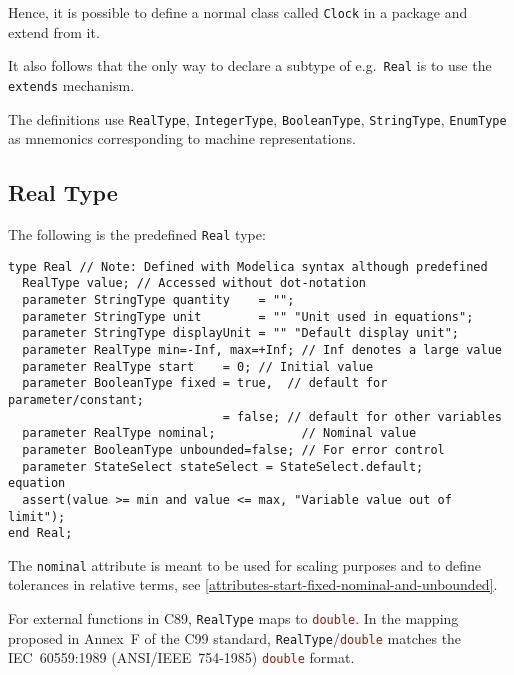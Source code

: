 \begin{nonnormative}
Hence, it is possible to define a normal class called \lstinline!Clock! in a package and extend from it.
\end{nonnormative}

\begin{nonnormative}
It also follows that the only way to declare a subtype of e.g.\ \lstinline!Real! is to use the \lstinline!extends! mechanism.
\end{nonnormative}

The definitions use \lstinline!RealType!, \lstinline!IntegerType!, \lstinline!BooleanType!, \lstinline!StringType!, \lstinline!EnumType!
as mnemonics corresponding to machine representations.

\subsection{Real Type}\label{real-type}

The following is the predefined \lstinline!Real! type:
\begin{lstlisting}[language=modelica]
type Real // Note: Defined with Modelica syntax although predefined
  RealType value; // Accessed without dot-notation
  parameter StringType quantity    = "";
  parameter StringType unit        = "" "Unit used in equations";
  parameter StringType displayUnit = "" "Default display unit";
  parameter RealType min=-Inf, max=+Inf; // Inf denotes a large value
  parameter RealType start    = 0; // Initial value
  parameter BooleanType fixed = true,  // default for parameter/constant;
                              = false; // default for other variables
  parameter RealType nominal;            // Nominal value
  parameter BooleanType unbounded=false; // For error control
  parameter StateSelect stateSelect = StateSelect.default;
equation
  assert(value >= min and value <= max, "Variable value out of limit");
end Real;
\end{lstlisting}

The \lstinline!nominal! attribute is meant to be used for scaling purposes and to
define tolerances in relative terms, see \cref{attributes-start-fixed-nominal-and-unbounded}.

\begin{nonnormative}
For external functions in C89, \lstinline!RealType! maps to \lstinline[language=C]!double!.  In the mapping proposed in Annex~F of the C99 standard,
\lstinline!RealType!/\lstinline[language=C]!double! matches the IEC~60559:1989 (ANSI/IEEE~754-1985) \lstinline[language=C]!double! format.
\end{nonnormative}


